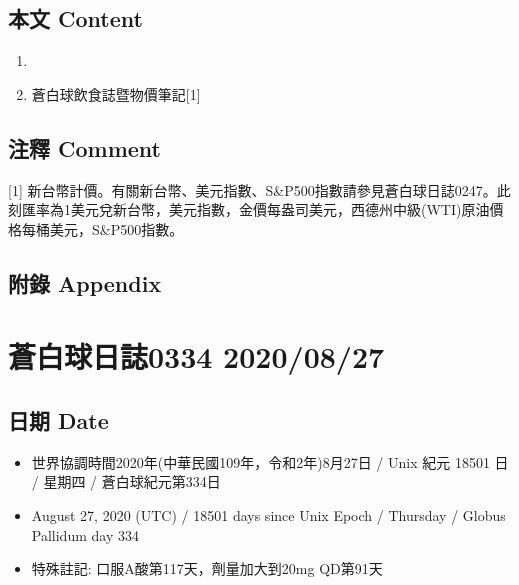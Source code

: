 \documentclass[a5paper, 11pt
]{book}
\providecommand{\tightlist}{%
  \setlength{\itemsep}{0pt}\setlength{\parskip}{0pt}}
\begin{document}
\hypertarget{ux672cux6587-content-86}{%
\subsection{本文 Content}\label{ux672cux6587-content-86}}

\begin{enumerate}
\def\labelenumi{\arabic{enumi}.}
\tightlist
\item
\item
  蒼白球飲食誌暨物價筆記{[}1{]}
\end{enumerate}

\hypertarget{ux6ce8ux91cb-comment-86}{%
\subsection{注釋 Comment}\label{ux6ce8ux91cb-comment-86}}

{[}1{]}
新台幣計價。有關新台幣、美元指數、S\&P500指數請參見蒼白球日誌0247。此刻匯率為1美元兌新台幣，美元指數，金價每盎司美元，西德州中級(WTI)原油價格每桶美元，S\&P500指數。

\hypertarget{ux9644ux9304-appendix-86}{%
\subsection{附錄 Appendix}\label{ux9644ux9304-appendix-86}}

\hypertarget{ux84bcux767dux7403ux65e5ux8a8c0334-20200827}{%
\section{蒼白球日誌0334
2020/08/27}\label{ux84bcux767dux7403ux65e5ux8a8c0334-20200827}}

\hypertarget{ux65e5ux671f-date-87}{%
\subsection{日期 Date}\label{ux65e5ux671f-date-87}}

\begin{itemize}
\tightlist
\item
  世界協調時間2020年(中華民國109年，令和2年)8月27日 / Unix 紀元 18501 日
  / 星期四 / 蒼白球紀元第334日
\item
  August 27, 2020 (UTC) / 18501 days since Unix Epoch / Thursday /
  Globus Pallidum day 334
\item
  特殊註記: 口服A酸第117天，劑量加大到20mg QD第91天
\end{itemize}
\end{document}
